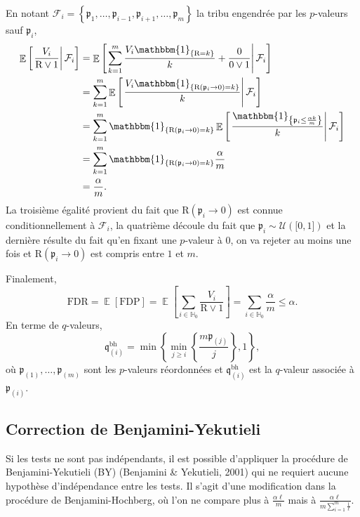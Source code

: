 \documentclass[12pt,a4paper]{reedthesis}
\newcommand \indic {\mathbbm{1}}
\DeclareMathOperator*{\esp}{\mathbb{E}}
\newcommand \EE [1]{\esp\left[{#1}\right]}
\newcommand \unif [1] {\mathcal{U}\left({#1}\right)}
\newcommand \pv {\mathfrak{p}}
\newcommand \qv {\mathfrak{q}}
\theoremstyle{definition}
\theoremstyle{definition}
\theoremstyle{definition}
\theoremstyle{remark}
\begin{document}
En notant \(\mathcal{F}_i = \left\{\pv_1, \ldots, \pv_{i-1}, \pv_{i+1}, \ldots, \pv_m \right\}\) la tribu engendrée par les \(p\)-valeurs sauf \(\pv_i\),
\begin{equation*}
\begin{aligned}
\EE{\left.\frac{V_i}{\text{R}\vee 1} \right| \mathcal{F}_i} & = \EE{\left.\sum_{k = 1}^m\frac{V_i\indic_{\left\{\text{R}=k\right\}}}{k} + \frac{0}{0\vee1} \right| \mathcal{F}_i} \\
& = \sum_{k = 1}^m \EE{\left.\frac{V_i\indic_{\left\{\text{R}(\pv_i \rightarrow 0)=k\right\}}}{k}\right| \mathcal{F}_i} \\
& = \sum_{k = 1}^m \indic_{\left\{\text{R}(\pv_i \rightarrow 0)=k\right\}} \EE{\left.\frac{\indic_{\left\{\pv_i \leq \frac{\alpha k}{m}\right\}}}{k}\right| \mathcal{F}_i} \\
& = \sum_{k = 1}^m \indic_{\left\{\text{R}(\pv_i \rightarrow 0)=k\right\}} \frac{\alpha}{m} \\
& = \frac{\alpha}{m}.
\end{aligned}
\end{equation*}
La troisième égalité provient du fait que \(\text{R}(\pv_i \rightarrow 0)\) est connue conditionnellement à \(\mathcal{F}_i\), la quatrième découle du fait que \(\pv_i \sim \unif{\mathopen[0, 1\mathclose]}\) et la dernière résulte du fait qu'en fixant une \(p\)-valeur à \(0\), on va rejeter au moins une fois et \(\text{R}(\pv_i \rightarrow 0)\) est compris entre \(1\) et \(m\).

Finalement,
\begin{equation*}
\text{FDR} = \EE{\text{FDP}} = \EE{\sum_{i\in \mathbb{H}_0} \frac{V_i}{\text{R} \vee 1}} = \sum_{i\in \mathbb{H}_0}\frac{\alpha}{m} \leq \alpha.
\end{equation*}
En terme de \(q\)-valeurs,
\begin{equation*}
\qv^{\text{bh}}_{(i)} = \min\left\{\min_{j\ge i}\left\{\frac{m\pv_{(j)}}{j}\right\},1\right\},
\end{equation*}
où \(\pv_{(1)}, \ldots, \pv_{(m)}\) sont les \(p\)-valeurs réordonnées et \(\qv^{\text{bh}}_{(i)}\) est la \(q\)-valeur associée à \(\pv_{(i)}\).

\hypertarget{correction-de-benjamini-yekutieli}{%
\subsection{Correction de Benjamini-Yekutieli}\label{correction-de-benjamini-yekutieli}}

Si les tests ne sont pas indépendants, il est possible d'appliquer la procédure de Benjamini-Yekutieli (BY) (Benjamini \& Yekutieli, 2001) qui ne requiert aucune hypothèse d'indépendance entre les tests. Il s'agit d'une modification dans la procédure de Benjamini-Hochberg, où l'on ne compare plus à \(\frac{\alpha\ell}{m}\) mais à \(\frac{\alpha\ell}{m\sum_{i = 1}^m \frac{1}{\ell}}\).
\end{document}
